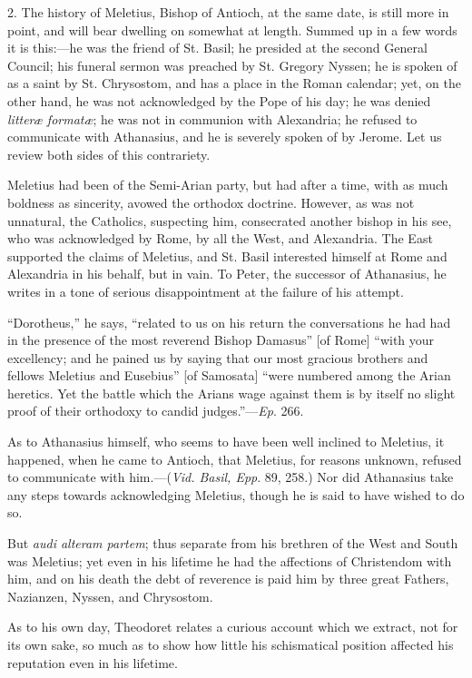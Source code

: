 2. The history of Meletius, Bishop of Antioch, at
the same date, is still more in point, and will bear dwelling on
somewhat at length. Summed up in a few words it is this:—he was the
friend of St. Basil; he presided at the second General Council; his
funeral sermon was preached by St. Gregory Nyssen; he is spoken of as
a saint by St. Chrysostom, and has a place in the Roman calendar; yet,
on the other hand, he was not acknowledged by the Pope of his day; he
was denied \emph{litteræ formatæ}; he was not in communion with
Alexandria; he refused to communicate with Athanasius, and he is
severely spoken of by Jerome. Let us review both sides of this
contrariety.

Meletius had been of the Semi-Arian party, but
had after a time, with as much boldness as sincerity, avowed the
orthodox doctrine. However, as was not unnatural, the Catholics,
suspecting him, consecrated another bishop in his see, who was
acknowledged by Rome, by all the West, and Alexandria. The East
supported the claims of Meletius, and St. Basil interested himself at
Rome and Alexandria in his behalf, but in vain. To Peter, the
successor of Athanasius, he writes in a tone of serious disappointment
at the failure of his attempt.

``Dorotheus,''
he says, ``related to us on his return the conversations he
had had in the presence of the most reverend Bishop Damasus'' [of
Rome] ``with your excellency; and he pained us by saying that our
most gracious brothers and fellows Meletius and Eusebius'' [of Samosata]
``were numbered among the Arian heretics. Yet the battle
which the Arians wage against them is by itself no slight proof of
their orthodoxy to candid judges.''—\emph{Ep}. 266.

As to Athanasius himself, who seems to have been
well inclined to Meletius, it happened, when he came to Antioch, that
Meletius, for reasons unknown, refused to communicate with him.—(\emph{Vid.
Basil, Epp}. 89, 258.) Nor did Athanasius take any steps towards
acknowledging Meletius, though he is said to have wished to do so.

But \emph{audi alteram partem}; thus separate
from his brethren of the West and South was Meletius; yet even in his
lifetime he had the affections of Christendom with him, and on his
death the debt of reverence is paid him by three great Fathers,
Nazianzen, Nyssen, and Chrysostom.

As to his own day, Theodoret relates a curious
account which we extract, not for its own sake, so much as to show how
little his schismatical position affected his reputation even in his
lifetime.

